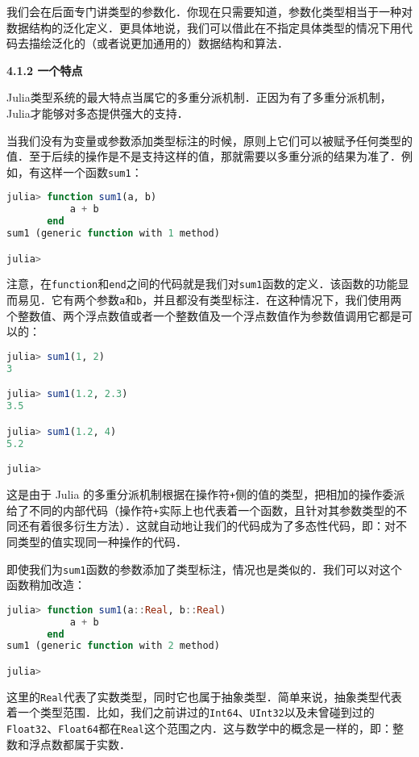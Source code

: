 我们会在后面专门讲类型的参数化．你现在只需要知道，参数化类型相当于一种对数据结构的泛化定义．更具体地说，我们可以借此在不指定具体类型的情况下用代码去描绘泛化的（或者说更加通用的）数据结构和算法．

\textbf{4.1.2 一个特点}

Julia类型系统的最大特点当属它的多重分派机制．正因为有了多重分派机制，Julia才能够对多态提供强大的支持．

当我们没有为变量或参数添加类型标注的时候，原则上它们可以被赋予任何类型的值．至于后续的操作是不是支持这样的值，那就需要以多重分派的结果为准了．例如，有这样一个函数\verb|sum1|：

\begin{lstlisting}[language=julia]
julia> function sum1(a, b)
           a + b
       end
sum1 (generic function with 1 method)

julia> 
\end{lstlisting}

注意，在\verb|function|和\verb|end|之间的代码就是我们对\verb|sum1|函数的定义．该函数的功能显而易见．它有两个参数\verb|a|和\verb|b|，并且都没有类型标注．在这种情况下，我们使用两个整数值、两个浮点数值或者一个整数值及一个浮点数值作为参数值调用它都是可以的：

\begin{lstlisting}[language=julia]
julia> sum1(1, 2)
3

julia> sum1(1.2, 2.3)
3.5

julia> sum1(1.2, 4)
5.2

julia> 
\end{lstlisting}

这是由于 Julia 的多重分派机制根据在操作符\verb|+|侧的值的类型，把相加的操作委派给了不同的内部代码（操作符\verb|+|实际上也代表着一个函数，且针对其参数类型的不同还有着很多衍生方法）．这就自动地让我们的代码成为了多态性代码，即：对不同类型的值实现同一种操作的代码．

即使我们为\verb|sum1|函数的参数添加了类型标注，情况也是类似的．我们可以对这个函数稍加改造：

\begin{lstlisting}[language=julia]
julia> function sum1(a::Real, b::Real)
           a + b
       end
sum1 (generic function with 2 method)

julia> 
\end{lstlisting}

这里的\verb|Real|代表了实数类型，同时它也属于抽象类型．简单来说，抽象类型代表着一个类型范围．比如，我们之前讲过的\verb|Int64|、\verb|UInt32|以及未曾碰到过的\verb|Float32|、\verb|Float64|都在\verb|Real|这个范围之内．这与数学中的概念是一样的，即：整数和浮点数都属于实数．


